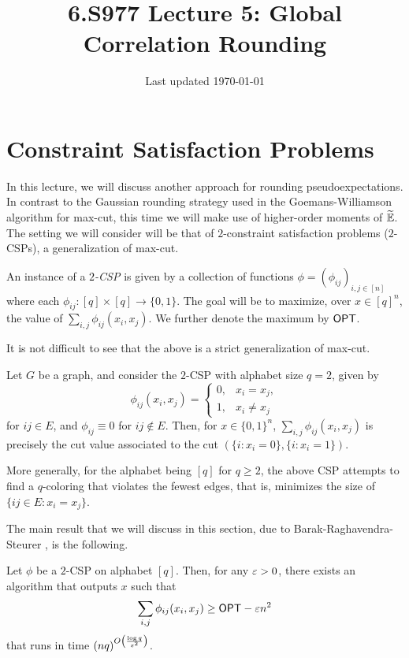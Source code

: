 \documentclass{article}
\title{6.S977 Lecture 5: Global Correlation Rounding}
\author{}
\date{Last updated \today}
\begin{document}
\maketitle
\thispagestyle{empty}

\section{Constraint Satisfaction Problems}

In this lecture, we will discuss another approach for rounding pseudoexpectations. In contrast to the Gaussian rounding strategy used in the Goemans-Williamson algorithm for max-cut, this time we will make use of higher-order moments of $\widetilde{\mathbb{E}}$.	The setting we will consider will be that of $2$-constraint satisfaction problems ($2$-CSPs), a generalization of max-cut.

\begin{fpr}
	An instance of a \emph{$2$-CSP} is given by a collection of functions $\phi = (\phi_{ij})_{i,j \in [n]}$ where each $\phi_{ij} : [q] \times [q] \to \{0,1\}$. The goal will be to maximize, over $x \in [q]^n$, the value of $\sum_{i,j}\phi_{ij}(x_i,x_j)$. We further denote the maximum by $\mathsf{OPT}$.
\end{fpr}

It is not difficult to see that the above is a strict generalization of max-cut.

\begin{fex}
	Let $G$ be a graph, and consider the $2$-CSP with alphabet size $q = 2$, given by
	\[ \phi_{ij}(x_i,x_j) = \begin{cases} 0, & x_i = x_j, \\ 1, & x_i \ne x_j \end{cases} \]
	for $ij \in E$, and $\phi_{ij} \equiv 0$ for $ij\not\in E$. Then, for $x \in \{0,1\}^n$, $\sum_{i,j} \phi_{ij}(x_i,x_j)$ is precisely the cut value associated to the cut $\left( \{i : x_i = 0\} , \{i : x_i = 1\} \right)$.

	More generally, for the alphabet being $[q]$ for $q\ge 2$, the above CSP attempts to find a $q$-coloring that violates the fewest edges, that is, minimizes the size of $\{ ij \in E : x_i = x_j \}$.
\end{fex}

The main result that we will discuss in this section, due to Barak-Raghavendra-Steurer \cite{BRS11}, is the following.

\begin{ftheo}
	Let $\phi$ be a $2$-CSP on alphabet $[q]$. Then, for any $\varepsilon > 0$, there exists an algorithm that outputs $x$ such that
	\[ \sum_{i,j} \phi_{ij}(x_i,x_j) \ge \mathsf{OPT} - \varepsilon n^2 \]
	that runs in time $(nq)^{O\left( \frac{\log q}{\varepsilon^2} \right)}$.
\end{ftheo}
\end{document}
